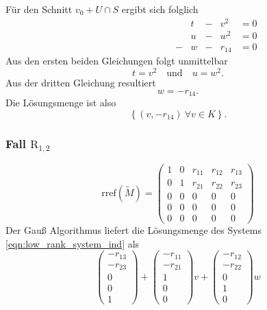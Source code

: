 \documentclass[a4paper,oneside, 11pt, openany%
]{article}
\theoremstyle{custom}
\theoremstyle{custom}
\begin{document}
Für den Schnitt $v_0 + U \cap S $ ergibt sich folglich
\begin{equation*}
	\begin{alignedat}{14}
		&&&&&&&&&&&t&-&v^2&= 0\\
		&&&&&&&&&&&u&-&w^2&= 0\\
		&&&&&&&&&&-&w&-&r_{14}&=0
	\end{alignedat}
\end{equation*}
Aus den ersten beiden Gleichungen folgt unmittelbar
\begin{equation*}
	t = v^2 \quad \text{und} \quad u = w^2.
\end{equation*}
Aus der dritten Gleichung resultiert
\begin{equation*}
	w = -r_{14}.
\end{equation*}
Die Lösungsmenge ist also 
\begin{equation*}
	\left\lbrace (v,-r_{14})  \ \forall v \in K\right\rbrace.
\end{equation*}
\subsubsection*{Fall $\text{R}_{1,2}$}
\begin{equation*}\label{eqn:rref_r12}
	\text{rref}(\tilde{M}) =
	\left( \begin{array}{ccccc}
		1&0&r_{11}&r_{12}&r_{13}\\
		0&1&r_{21}&r_{22}&r_{23}\\
		0&0&0&0&0\\
		0&0&0&0&0\\
		0&0&0&0&0
	\end{array}\right)
\end{equation*}
Der Gauß Algorithmus liefert die Lösungsmenge des Systems \eqref{eqn:low_rank_system_ind} als
\begin{equation*}
	\begin{pmatrix}
		-r_{13}\\
		-r_{23}\\
		0\\
		0\\
		1
	\end{pmatrix} +
	\begin{pmatrix}
		-r_{11}\\
		-r_{21}\\
		1\\
		0\\
		0
	\end{pmatrix}v +
	\begin{pmatrix}
		-r_{12}\\
		-r_{22}\\
		0\\
		1\\
		0
	\end{pmatrix}w
\end{equation*}
\end{document}
